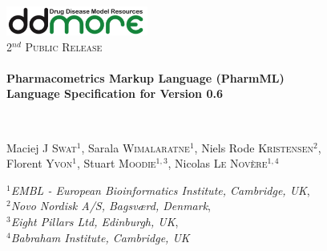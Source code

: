 \begin{titlepage}
\begin{center}

\includegraphics[width=0.35\textwidth]{./logos/ddmore_logo}~\\[1cm]

%
\textsc{\Large 2$^{nd}$ Public Release}\\[0.5cm]

\HRule \\[0.4cm]
{ \LARGE \bfseries Pharmacometrics Markup Language (PharmML) \\[0.2cm]}
{ \Large \bfseries Language Specification for Version 0.6 \\[0.4cm] }

\HRule \\[1.5cm]

\begin{minipage}{0.8\textwidth}
\begin{flushleft} \large
Maciej J \textsc{Swat}$^1$, Sarala \textsc{Wimalaratne}$^1$, Niels Rode \textsc{Kristensen}$^2$,\\
Florent \textsc{Yvon}$^1$, Stuart \textsc{Moodie}$^{1,3}$, Nicolas \textsc{Le Nov\`{e}re}$^{1,4}$\\
\end{flushleft}
\end{minipage}
\bigskip

\begin{minipage}{0.8\textwidth}
\begin{flushleft} \large
$^1$\emph{EMBL - European Bioinformatics Institute, Cambridge, UK}, \\ $^2$\emph{Novo Nordisk A/S, Bagsv\ae rd, Denmark}, \\
$^3$\emph{Eight Pillars Ltd, Edinburgh, UK}, \\ $^4$\emph{Babraham Institute, Cambridge, UK}
\end{flushleft}
\end{minipage}


\end{center}
\end{titlepage}
